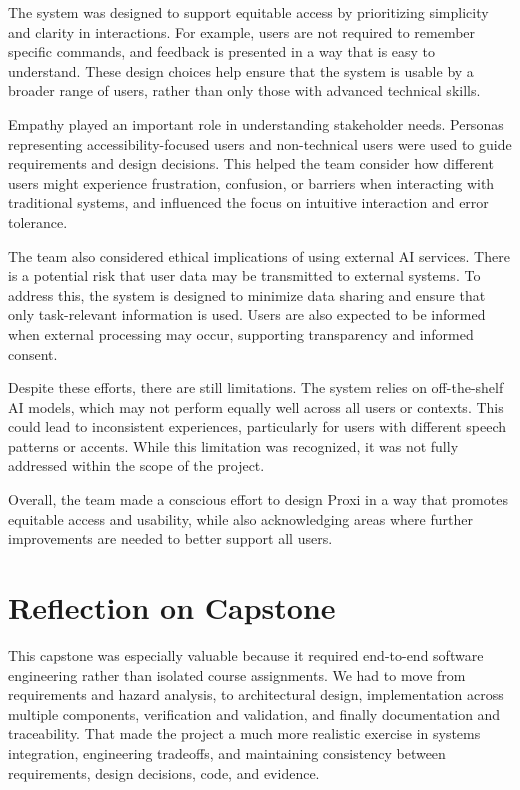 \documentclass{article}
\begin{document}
The system was designed to support equitable access by prioritizing
simplicity and clarity in interactions. For example, users are not
required to remember specific commands, and feedback is presented in a
way that is easy to understand. These design choices help ensure that
the system is usable by a broader range of users, rather than only those
with advanced technical skills.

Empathy played an important role in understanding stakeholder needs.
Personas representing accessibility-focused users and non-technical
users were used to guide requirements and design decisions. This helped
the team consider how different users might experience frustration,
confusion, or barriers when interacting with traditional systems, and
influenced the focus on intuitive interaction and error tolerance.

The team also considered ethical implications of using external AI
services. There is a potential risk that user data may be transmitted to
external systems. To address this, the system is designed to minimize
data sharing and ensure that only task-relevant information is used.
Users are also expected to be informed when external processing may
occur, supporting transparency and informed consent.

Despite these efforts, there are still limitations. The system relies on
off-the-shelf AI models, which may not perform equally well across all
users or contexts. This could lead to inconsistent experiences,
particularly for users with different speech patterns or accents. While
this limitation was recognized, it was not fully addressed within the
scope of the project.

Overall, the team made a conscious effort to design Proxi in a way that
promotes equitable access and usability, while also acknowledging areas
where further improvements are needed to better support all users.

\section{Reflection on Capstone}

This capstone was especially valuable because it required end-to-end
software engineering rather than isolated course assignments. We had to
move from requirements and hazard analysis, to architectural design,
implementation across multiple components, verification and validation,
and finally documentation and traceability. That made the project a much
more realistic exercise in systems integration, engineering tradeoffs,
and maintaining consistency between requirements, design decisions, code,
and evidence.
\end{document}
